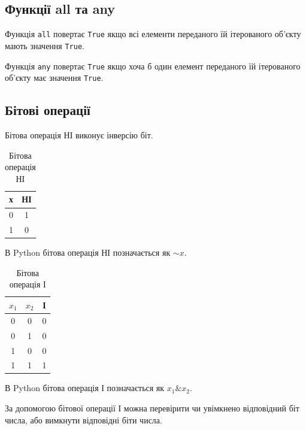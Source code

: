  \subsection{Функції all та any} 
\begin{frame}
Функція \texttt{all} повертає \texttt{True} якщо всі елементи переданого їй ітерованого об'єкту мають значення \texttt{True}.

Функція \texttt{any} повертає \texttt{True} якщо хоча б один елемент переданого їй ітерованого об'єкту має значення \texttt{True}.
\end{frame}

\subsection{Бітові операції} 
\begin{frame}
Бітова операція НІ виконує інверсію біт.

\begin{table}
  \caption{Бітова операція НІ}
  \label{tab:}

  \begin{center}
    \begin{tabular}{|c|c|}
    \hline
      \textbf{х} & \textbf{НІ} \\
    \hline
      0 & 1 \\
    \hline
      1 & 0 \\
    \hline
    \end{tabular}
  \end{center}
\end{table}

В Python бітова операція НІ позначається як $\sim x$.

\end{frame}

\begin{frame}

\begin{table}
  \caption{Бітова операція І}
  \label{tab:}

  \begin{center}
    \begin{tabular}{|c|c|c|}
    \hline
      \textbf{$x_1$} & \textbf{$x_2$} &  \textbf{І} \\
    \hline
      0 & 0 & 0 \\
    \hline
      0 & 1 & 0 \\
    \hline
      1 & 0 & 0 \\
    \hline
      1 & 1 & 1 \\
    \hline
    \end{tabular}
  \end{center}
\end{table}


В Python бітова операція І позначається як $x_1 \& x_2$.

За допомогою бітової операції І можна перевірити чи увімкнено відповідний біт числа, або вимкнути відповідні біти числа.

\end{frame}

